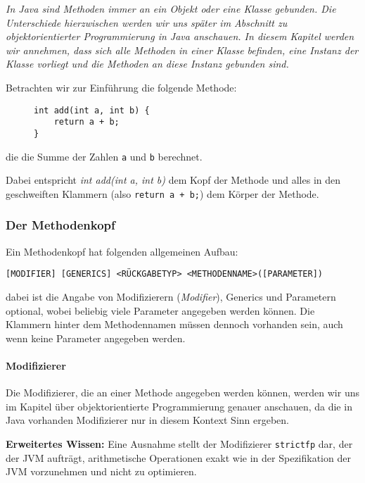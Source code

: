 
\textit{In Java sind Methoden immer an ein Objekt oder eine Klasse gebunden. Die Unterschiede hierzwischen werden wir uns später im Abschnitt  zu objektorientierter Programmierung in Java anschauen. In diesem Kapitel werden wir annehmen, dass sich alle Methoden in einer Klasse befinden, eine Instanz der Klasse vorliegt und die Methoden an diese Instanz gebunden sind.}

Betrachten wir zur Einführung die folgende Methode:
\begin{figure}[H]
	\centering
	\begin{lstlisting}
int add(int a, int b) {
	return a + b;
}
	\end{lstlisting}
\end{figure}
die die Summe der Zahlen \texttt{a} und \texttt{b} berechnet.

Dabei entspricht \textit{int add(int a, int b)} dem Kopf der Methode und alles in den geschweiften Klammern (also \texttt{return a + b;}) dem Körper der Methode.

\subsubsection{Der Methodenkopf}
	Ein Methodenkopf hat folgenden allgemeinen Aufbau:
	\begin{center}
		\texttt{[MODIFIER] [GENERICS] <RÜCKGABETYP> <METHODENNAME>([PARAMETER])}
	\end{center}
	dabei ist die Angabe von Modifizierern (\textit{Modifier}), Generics und Parametern optional, wobei beliebig viele Parameter angegeben werden können. Die Klammern hinter dem Methodennamen müssen dennoch vorhanden sein, auch wenn keine Parameter angegeben werden.
	
	\paragraph{Modifizierer}
		Die Modifizierer, die an einer Methode angegeben werden können, werden wir uns im Kapitel über objektorientierte Programmierung genauer anschauen, da die in Java vorhanden Modifizierer nur in diesem Kontext Sinn ergeben.
		
		\textbf{Erweitertes Wissen:} Eine Ausnahme stellt der Modifizierer \texttt{strictfp} dar, der der JVM aufträgt, arithmetische Operationen exakt wie in der Spezifikation der JVM vorzunehmen und nicht zu optimieren.
	
